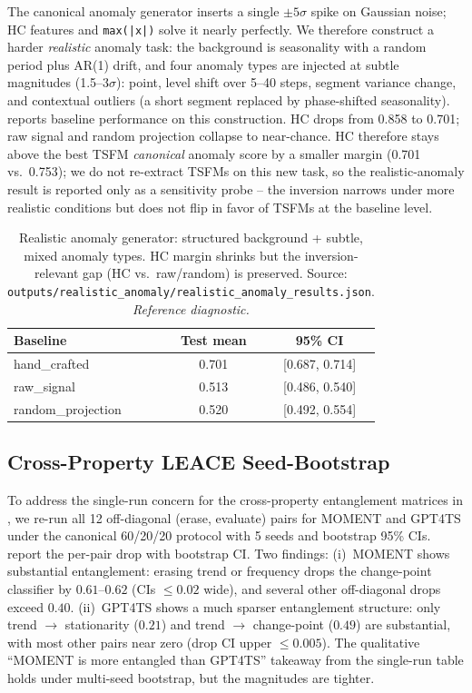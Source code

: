 \documentclass{article}
\begin{document}
The canonical anomaly generator inserts a single $\pm 5\sigma$ spike on Gaussian noise; HC features and \texttt{max(|x|)} solve it nearly perfectly. We therefore construct a harder \emph{realistic} anomaly task: the background is seasonality with a random period plus AR(1) drift, and four anomaly types are injected at subtle magnitudes (1.5--3$\sigma$): point, level shift over 5--40 steps, segment variance change, and contextual outliers (a short segment replaced by phase-shifted seasonality).  reports baseline performance on this construction. HC drops from 0.858 to 0.701; raw signal and random projection collapse to near-chance. HC therefore stays above the best TSFM \emph{canonical} anomaly score by a smaller margin (0.701 vs.\ 0.753); we do not re-extract TSFMs on this new task, so the realistic-anomaly result is reported only as a sensitivity probe -- the inversion narrows under more realistic conditions but does not flip in favor of TSFMs at the baseline level.

\begin{table}[htbp]
\caption{Realistic anomaly generator: structured background + subtle, mixed anomaly types. HC margin shrinks but the inversion-relevant gap (HC vs.\ raw/random) is preserved. Source: \texttt{outputs/realistic\_anomaly/realistic\_anomaly\_results.json}. \emph{Reference diagnostic.}}
\label{tab:realistic_anomaly}
\centering
\small
\begin{tabular}{lcc}
\toprule
Baseline           & Test mean & 95\% CI \\
\midrule
hand\_crafted        & 0.701 & [0.687, 0.714] \\
raw\_signal          & 0.513 & [0.486, 0.540] \\
random\_projection   & 0.520 & [0.492, 0.554] \\
\bottomrule
\end{tabular}
\end{table}

\subsection{Cross-Property LEACE Seed-Bootstrap}
\label{sec:cross_property_bootstrap}
\label{sec:appendix_cross_leace_bootstrap}

To address the single-run concern for the cross-property entanglement
matrices in , we
re-run all 12 off-diagonal (erase, evaluate) pairs for MOMENT and GPT4TS under
the canonical 60/20/20 protocol with 5 seeds and bootstrap 95\% CIs.
report the per-pair drop with bootstrap CI. Two findings:
(i)~MOMENT shows substantial entanglement: erasing trend or frequency drops
the change-point classifier by $0.61$--$0.62$ (CIs $\leq 0.02$ wide), and
several other off-diagonal drops exceed $0.40$.
(ii)~GPT4TS shows a much sparser entanglement structure: only
trend $\to$ stationarity ($0.21$) and trend $\to$ change-point ($0.49$) are
substantial, with most other pairs near zero (drop CI upper $\leq 0.005$).
The qualitative ``MOMENT is more entangled than GPT4TS'' takeaway from the
single-run table holds under multi-seed bootstrap, but the magnitudes are
tighter.
\end{document}
